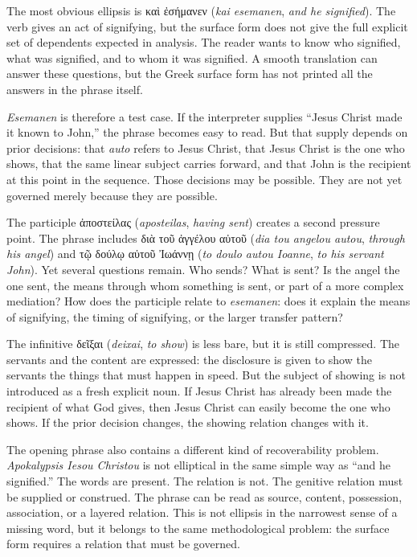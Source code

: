 The most obvious ellipsis is \textgreek{καὶ ἐσήμανεν} (\textit{kai esemanen}, \textit{and he signified}). The verb gives an act of signifying, but the surface form does not give the full explicit set of dependents expected in analysis. The reader wants to know who signified, what was signified, and to whom it was signified. A smooth translation can answer these questions, but the Greek surface form has not printed all the answers in the phrase itself.

\textit{Esemanen} is therefore a test case. If the interpreter supplies ``Jesus Christ made it known to John,'' the phrase becomes easy to read. But that supply depends on prior decisions: that \textit{auto} refers to Jesus Christ, that Jesus Christ is the one who shows, that the same linear subject carries forward, and that John is the recipient at this point in the sequence. Those decisions may be possible. They are not yet governed merely because they are possible.

The participle \textgreek{ἀποστείλας} (\textit{aposteilas}, \textit{having sent}) creates a second pressure point. The phrase includes \textgreek{διὰ τοῦ ἀγγέλου αὐτοῦ} (\textit{dia tou angelou autou}, \textit{through his angel}) and \textgreek{τῷ δούλῳ αὐτοῦ Ἰωάννῃ} (\textit{to doulo autou Ioanne}, \textit{to his servant John}). Yet several questions remain. Who sends? What is sent? Is the angel the one sent, the means through whom something is sent, or part of a more complex mediation? How does the participle relate to \textit{esemanen}: does it explain the means of signifying, the timing of signifying, or the larger transfer pattern?

The infinitive \textgreek{δεῖξαι} (\textit{deixai}, \textit{to show}) is less bare, but it is still compressed. The servants and the content are expressed: the disclosure is given to show the servants the things that must happen in speed. But the subject of showing is not introduced as a fresh explicit noun. If Jesus Christ has already been made the recipient of what God gives, then Jesus Christ can easily become the one who shows. If the prior decision changes, the showing relation changes with it.

The opening phrase also contains a different kind of recoverability problem. \textit{Apokalypsis Iesou Christou} is not elliptical in the same simple way as ``and he signified.'' The words are present. The relation is not. The genitive relation must be supplied or construed. The phrase can be read as source, content, possession, association, or a layered relation. This is not ellipsis in the narrowest sense of a missing word, but it belongs to the same methodological problem: the surface form requires a relation that must be governed.

